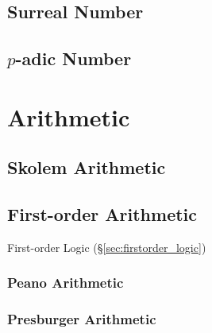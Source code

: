 \subsection{Surreal Number}\label{sec:surreal_number}

\subsection{$p$-adic Number}\label{sec:padic_number}



\section{Arithmetic}\label{sec:arithmetic}

\subsection{Skolem Arithmetic}\label{sec:skolem_arithmetic}\cite{skolem23}

\subsection{First-order Arithmetic}\label{sec:firstorder_arithmetic}

First-order Logic (\S\ref{sec:firstorder_logic})



\subsubsection{Peano Arithmetic}\label{sec:peano_arithmetic}

\subsubsection{Presburger Arithmetic}\label{sec:presburger_arithmetic}

